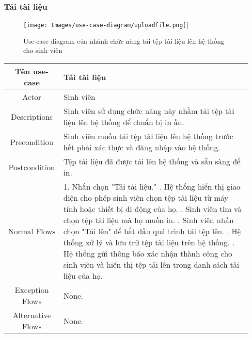 \subsubsection{Tải tài liệu}
\begin{figure}[H]
    \centering
    \texttt{[image: Images/use-case-diagram/uploadfile.png]}|
    \vspace{0.1cm}
    \caption{Use-case diagram của nhánh chức năng tải tệp tài liệu lên hệ thống cho sinh viên}
    \label{fig:enter-label}
\end{figure}
\begin{xltabular}{\textwidth}{|c|X|}
    \hline
    \textbf{Tên use-case} & \textbf{Tải tài liệu} \\
    \hline
    Actor & Sinh viên \\
    \hline
    Descriptions & Sinh viên sử dụng chức năng này nhằm tải tệp tài liệu lên hệ thống để chuẩn bị in ấn. \\
    \hline 
    Precondition & Sinh viên muốn tải tệp tài liệu lên hệ thống trước hết phải xác thực và đăng nhập vào hệ thống. \\
    \hline
    Postcondition & Tệp tài liệu đã được tải lên hệ thống và sẵn sàng để in.\\
    \hline
    Normal Flows & 
    1. Nhấn chọn "Tải tài liệu."
    . Hệ thống hiển thị giao diện cho phép sinh viên chọn tệp tài liệu từ máy tính hoặc thiết bị di động của họ.
    . Sinh viên tìm và chọn tệp tài liệu mà họ muốn in.
     . Sinh viên nhấn chọn "Tải lên" để bắt đầu quá trình tải tệp lên.
    . Hệ thống xử lý và lưu trữ tệp tài liệu trên hệ thống.
    . Hệ thống gửi thông báo xác nhận thành công cho sinh viên và hiển thị tệp tải lên trong danh sách tài liệu của họ.\\
    \hline
    Exception Flows & 
    None.\\
    \hline
    Alternative Flows & None.\\
    \hline
\end{xltabular}
\newpage
